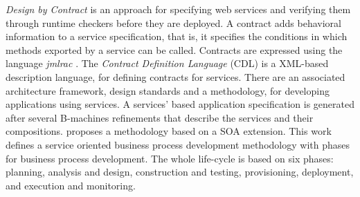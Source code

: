  \textit{Design by Contract} \cite{HL05TACoS} is an approach for specifying web services and verifying them through runtime checkers before they are deployed. A contract adds behavioral information to a service specification, that is, it specifies the conditions in which methods exported by a service can be called. Contracts are expressed using the language \textit{jmlrac} \cite{LeavensCCRC02}.
 The \textit{Contract Definition Language} (CDL) \cite{cdl2006} is a XML-based
description language, for defining contracts for services. There are an associated architecture framework, design standards and a methodology, for developing applications using services.  A services' based application  specification is generated after several
 \cite{AbrialLNSS91} B-machines refinements that describe the services and their
compositions.
\cite{PapazoglouH06} proposes a methodology based on a SOA extension. This work defines a service
oriented business process development methodology with phases for business process development. The whole life-cycle is based on six phases: planning, analysis and design, construction and testing, provisioning, deployment, and execution and monitoring.


